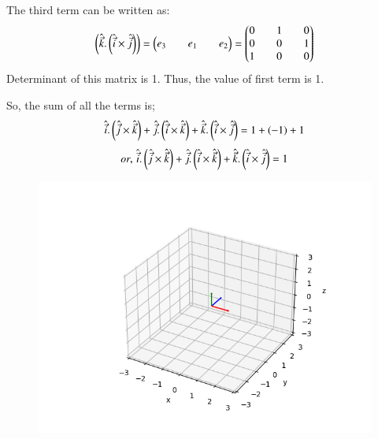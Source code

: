 \documentclass[journal]{IEEEtran}
\begin{document}
The third term can be written as:
\begin{align}
\left(\hat{\Vec{k}}.\left(\hat{\Vec{i}} \times \hat{\Vec{j}}\right)\right) = 
\begin{pmatrix}e_3 && e_1 && e_2\end{pmatrix} =
\begin{pmatrix}0 && 1 && 0 \\
       0 && 0 && 1 \\
       1 && 0 && 0\end{pmatrix}
\end{align}
Determinant of this matrix is 1. Thus, the value of first term is 1.

So, the sum of all the terms is;
\begin{align}
\hat{\Vec{i}}.\left(\hat{\Vec{j}} \times \hat{\Vec{k}}\right) + \hat{\Vec{j}}.\left(\hat{\Vec{i}} \times \hat{\Vec{k}}\right) + \hat{\Vec{k}}.\left(\hat{\Vec{i}} \times \hat{\Vec{j}}\right) = 1 + (-1) + 1
\end{align}
\begin{align}
or, \, \hat{\Vec{i}}.\left(\hat{\Vec{j}} \times \hat{\Vec{k}}\right) + \hat{\Vec{j}}.\left(\hat{\Vec{i}} \times \hat{\Vec{k}}\right) + \hat{\Vec{k}}.\left(\hat{\Vec{i}} \times \hat{\Vec{j}}\right) = 1
\end{align}

\begin{figure}[H]
\centering
\includegraphics[width=0.6\columnwidth]{figs/img.png}
\caption*{}
\end{figure}
\end{document}
